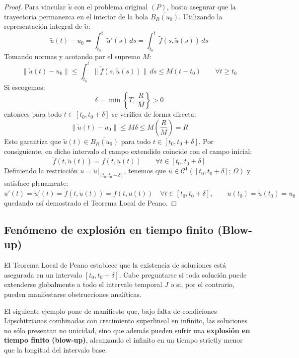 \begin{proof}
    Para vincular $\tilde{u}$ con el problema original $(P)$, basta asegurar que la trayectoria permanezca en el interior de la bola $\overline{B_R(u_0)}$. Utilizando la representación integral de $\tilde{u}$:
    \[
        \tilde{u}(t) - u_0 = \int_{t_0}^t \tilde{u}'(s) \, ds = \int_{t_0}^t \tilde{f}(s, \tilde{u}(s)) \, ds
    \]
    Tomando normas y acotando por el supremo $M$:
    \[
        \|\tilde{u}(t) - u_0\| \leq \int_{t_0}^t \|\tilde{f}(s, \tilde{u}(s))\| \, ds \leq M(t - t_0) \qquad \forall t \geq t_0
    \]
    Si escogemos:
    \[
        \delta = \min\left\{ T, \, \frac{R}{M} \right\} > 0
    \]
    entonces para todo $t \in [t_0, t_0 + \delta]$ se verifica de forma directa:
    \[
        \|\tilde{u}(t) - u_0\| \leq M \delta \leq M \left(\frac{R}{M}\right) = R
    \]
    Esto garantiza que $\tilde{u}(t) \in \overline{B_R(u_0)}$ para todo $t \in [t_0, t_0 + \delta]$. Por consiguiente, en dicho intervalo el campo extendido coincide con el campo inicial:
    \[
        \tilde{f}(t, \tilde{u}(t)) = f(t, \tilde{u}(t)) \qquad \forall t \in [t_0, t_0 + \delta]
    \]
    Definiendo la restricción $u = \tilde{u}|_{[t_0, t_0 + \delta]}$, tenemos que $u \in \mathcal{C}^1([t_0, t_0 + \delta]; \, \Omega)$ y satisface plenamente:
    \[
        u'(t) = \tilde{u}'(t) = \tilde{f}(t, \tilde{u}(t)) = f(t, u(t)) \quad \forall t \in [t_0, t_0 + \delta], \qquad u(t_0) = \tilde{u}(t_0) = u_0
    \]
    quedando así demostrado el Teorema Local de Peano.
\end{proof}

\subsection{Fenómeno de explosión en tiempo finito (Blow-up)}

El Teorema Local de Peano establece que la existencia de soluciones está asegurada en un intervalo $[t_0, t_0 + \delta]$. Cabe preguntarse si toda solución puede extenderse globalmente a todo el intervalo temporal $J$ o si, por el contrario, pueden manifestarse obstrucciones analíticas.

El siguiente ejemplo pone de manifiesto que, bajo falta de condiciones Lipschitzianas combinadas con crecimiento superlineal en infinito, las soluciones no sólo presentan no unicidad, sino que además pueden sufrir una \textbf{explosión en tiempo finito (blow-up)}, alcanzando el infinito en un tiempo strictly menor que la longitud del intervalo base.

